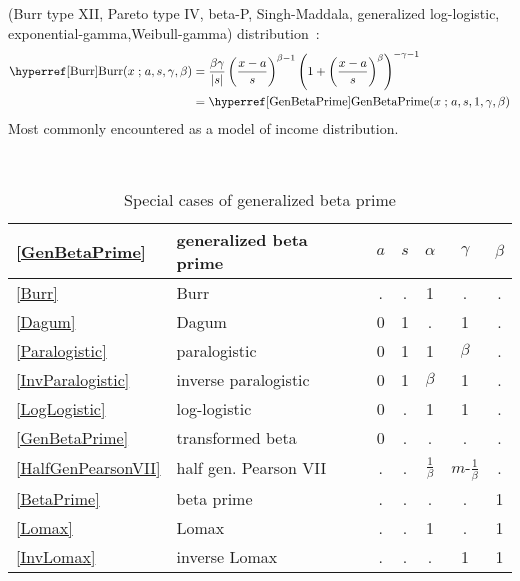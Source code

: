   (Burr type XII, Pareto type IV, beta-P, Singh-Maddala, generalized log-logistic, exponential-gamma,Weibull-gamma) 
distribution~\cite{Burr1942,Tadikamalla1980, Kleiber2003}:
\begin{align}
\label{Burr}
\opr{Burr}(x\given a, s, \gamma,\beta) 
&=  
 \frac{\beta \gamma}{|s|} \left(\frac{x-a}{s}\right)^{\beta-1}  \left(1+\left(\frac{x-a}{s}\right)^\beta\right)^{-\gamma-1} 
 \checked
\\ & = \opr{GenBetaPrime}(x\given a, s, 1,\gamma,\beta) \notag   \checked
\end{align}
Most commonly encountered as a model of income distribution.



\begin{table*}[tp]
\begin{center}
\caption[Generalized beta prime distribution -- Special cases]{Special cases of generalized beta prime}
\label{GenBetaPrimeTable}
~\\
{\renewcommand{\arraystretch}{1.25} 
\begin{tabular}{llccccc}
\eqref{GenBetaPrime}  & generalized beta prime & $a$ & $s$ & $\alpha$  &  $\gamma$ & ${\beta}$  \\
\hline
\eqref{Burr} & Burr 	        			&  .  &  .  &  1  &  .    &    .     \\
\eqref{Dagum} & Dagum			&  0  &  1 &  .  &  1   &    .     \\
\eqref{Paralogistic} & paralogistic			&  0 &  1  &  1  &  $\beta$    &    .     \\
\eqref{InvParalogistic} & inverse paralogistic	&  0 &  1  &   $\beta$& 1    &    .     \\
\eqref{LogLogistic} & log-logistic			&  0  &  . &  1  &  1  &    .     \\
\eqref{GenBetaPrime} & transformed beta			&  0  &  . &  .  &  .  &    .     \\
\eqref{HalfGenPearsonVII} & half gen. Pearson VII 		&  .  &  . &  $\tfrac{1}{\beta}$  &  $m$-$\tfrac{1}{\beta}$  &    .     \\
\eqref{BetaPrime} & beta prime		& . & . & . & . & 1  \\
\eqref{Lomax} & Lomax 				&  .  &  . &  1  &  .   &    1     \\
\eqref{InvLomax} & inverse Lomax 				&  .  &  . &  .  &  1   &    1     \\

\end{tabular}}
\end{center}
\end{table*}
